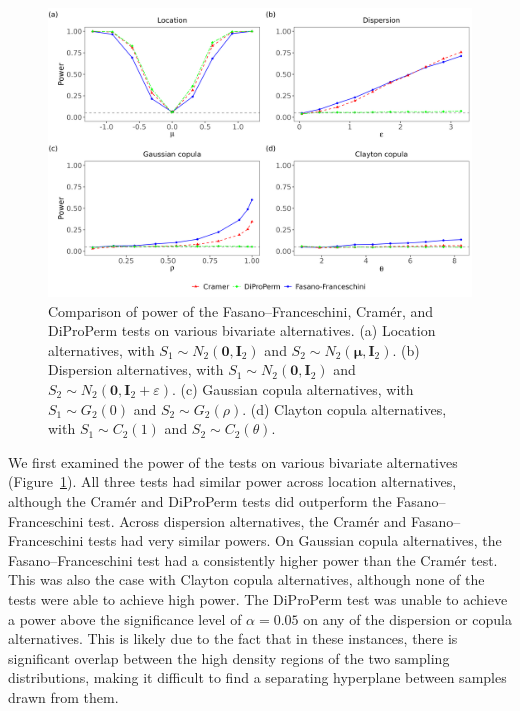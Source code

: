\begin{figure}[htbp]
\centering
\includegraphics[scale=0.50]{figures/fig5.png}
\caption{Comparison of power of the Fasano--Franceschini, Cram\'er, and DiProPerm tests on various bivariate alternatives. (a) Location alternatives, with $S_{1}\sim N_{2}(\mathbf{0},\mathbf{I}_{2})$ and $S_{2}\sim N_{2}(\boldsymbol\mu,\mathbf{I}_{2})$. (b) Dispersion alternatives, with $S_{1}\sim N_{2}(\mathbf{0},\mathbf{I}_{2})$ and $S_{2}\sim N_{2}(\mathbf{0},\mathbf{I}_{2}+\varepsilon)$. (c) Gaussian copula alternatives, with $S_{1}\sim G_{2}(0)$ and $S_{2}\sim G_{2}(\rho)$. (d) Clayton copula alternatives, with $S_{1}\sim C_{2}(1)$ and $S_{2}\sim C_{2}(\theta)$.}
\label{figure:bivariate_power}
\end{figure}

We first examined the power of the tests on various bivariate alternatives (Figure~\ref{figure:bivariate_power}). All three tests had similar power across location alternatives, although the Cram\'er and DiProPerm tests did outperform the Fasano--Franceschini test. Across dispersion alternatives, the Cram\'er and Fasano--Franceschini tests had very similar powers. On Gaussian copula alternatives, the Fasano--Franceschini test had a consistently higher power than the Cram\'er test. This was also the case with Clayton copula alternatives, although none of the tests were able to achieve high power. The DiProPerm test was unable to achieve a power above the significance level of $\alpha=0.05$ on any of the dispersion or copula alternatives. This is likely due to the fact that in these instances, there is significant overlap between the high density regions of the two sampling distributions, making it difficult to find a separating hyperplane between samples drawn from them.

